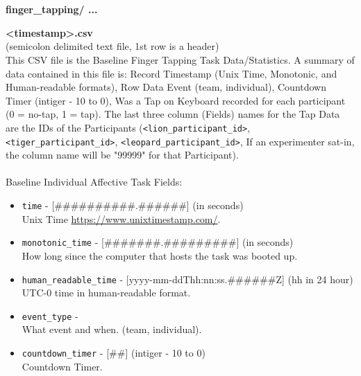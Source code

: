 \begin{description}
\begin{addmargin}[0em]{0em}
    \end{addmargin} %


    \textbf{\\\\}
    \begin{addmargin}[0em]{0em} %
        \textbf{finger\_tapping/ ...}

        \begin{addmargin}[1em]{0em} %
            \textbf{<timestamp>.csv}\\(semicolon delimited text file, 1st row is a header)\\
            This CSV file is the Baseline Finger Tapping Task Data/Statistics.
            A summary of data contained in this file is: Record Timestamp (Unix Time, Monotonic, and Human-readable formats),
            Row Data Event (team, individual), Countdown Timer (intiger - 10 to 0), Was a Tap on Keyboard recorded for each participant (0 = no-tap, 1 = tap).
            The last three column (Fields) names for the Tap Data are the IDs of the Participants (\verb|<lion_participant_id>|, \verb|<tiger_participant_id>|,
            \verb|<leopard_participant_id>|, If an experimenter sat-in, the column name will be "99999" for that Participant).\\\\
            Baseline Individual Affective Task Fields:
            \begin{itemize}
                \item \verb|time| - [\#\#\#\#\#\#\#\#\#\#.\#\#\#\#\#\#] (in seconds)\\Unix Time \href{https://www.unixtimestamp.com/}{https://www.unixtimestamp.com/}.
                \item \verb|monotonic_time| - [\#\#\#\#\#\#\#.\#\#\#\#\#\#\#\#\#] (in seconds)\\How long since the computer that hosts the task was booted up.
                \item \verb|human_readable_time| - [yyyy-mm-ddThh:nn:ss.\#\#\#\#\#\#Z] (hh in 24 hour)\\ UTC-0 time in human-readable format.
                \item \verb|event_type| -\\What event and when. (team, individual).
                \item \verb|countdown_timer| - [\#\#] (intiger - 10 to 0)\\Countdown Timer.

\end{itemize}
\end{addmargin}
\end{addmargin}
\end{description}
